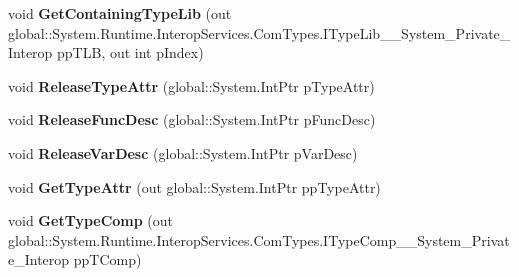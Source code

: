 \begin{DoxyCompactItemize}
void {\bfseries Get\+Containing\+Type\+Lib} (out global\+::\+System.\+Runtime.\+Interop\+Services.\+Com\+Types.\+I\+Type\+Lib\+\_\+\+\_\+\+System\+\_\+\+Private\+\_\+\+Interop pp\+T\+LB, out int p\+Index)
\item 
\mbox{\label{interface_system_1_1_runtime_1_1_interop_services_1_1_com_types_1_1_i_type_info_____system___private___interop_a455eccf7a3747e78838d503b18d828a5}} 
void {\bfseries Release\+Type\+Attr} (global\+::\+System.\+Int\+Ptr p\+Type\+Attr)
\item 
\mbox{\label{interface_system_1_1_runtime_1_1_interop_services_1_1_com_types_1_1_i_type_info_____system___private___interop_a979479883b01e365a0b69c48061af1d5}} 
void {\bfseries Release\+Func\+Desc} (global\+::\+System.\+Int\+Ptr p\+Func\+Desc)
\item 
\mbox{\label{interface_system_1_1_runtime_1_1_interop_services_1_1_com_types_1_1_i_type_info_____system___private___interop_a20edb454819b5c39b80eedc0169c18c0}} 
void {\bfseries Release\+Var\+Desc} (global\+::\+System.\+Int\+Ptr p\+Var\+Desc)
\item 
\mbox{\label{interface_system_1_1_runtime_1_1_interop_services_1_1_com_types_1_1_i_type_info_____system___private___interop_af107e8fec3d7db9b77986546bf433034}} 
void {\bfseries Get\+Type\+Attr} (out global\+::\+System.\+Int\+Ptr pp\+Type\+Attr)
\item 
\mbox{\label{interface_system_1_1_runtime_1_1_interop_services_1_1_com_types_1_1_i_type_info_____system___private___interop_a15d5324083e03431c03093a57916f835}} 
void {\bfseries Get\+Type\+Comp} (out global\+::\+System.\+Runtime.\+Interop\+Services.\+Com\+Types.\+I\+Type\+Comp\+\_\+\+\_\+\+System\+\_\+\+Private\+\_\+\+Interop pp\+T\+Comp)
\item 
\mbox{\label{interface_system_1_1_runtime_1_1_interop_services_1_1_com_types_1_1_i_type_info_____system___private___interop_aad5ee60703eb42da04c249d933de9372}} 

\end{DoxyCompactItemize}
